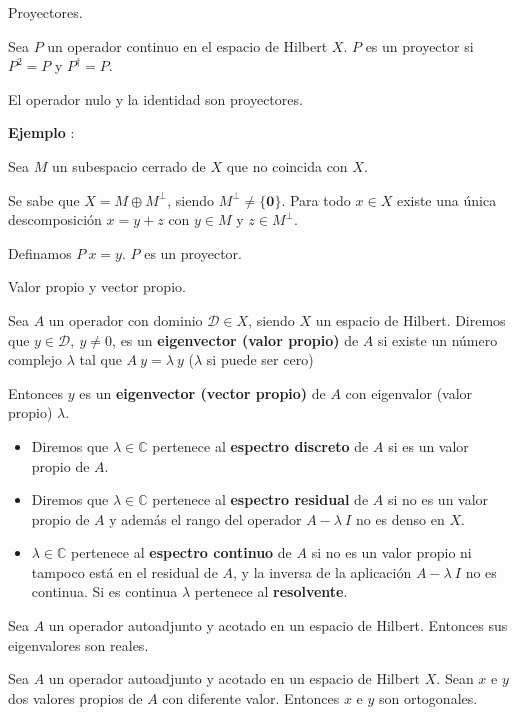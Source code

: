 \begin{defi} Proyectores.

Sea $P$ un operador continuo en el espacio de Hilbert $X$. $P$ es un proyector si $P^{2} = P$ y $P^{\dagger} =  P$.

El operador nulo y la identidad son proyectores.
\end{defi}
\textbf{Ejemplo} :

Sea $M$ un subespacio cerrado de $X$ que no coincida con $X$. 

Se sabe que $X =  M \oplus M^{\perp}$, siendo $M^{\perp} \neq \{ \bm{0} \}$. Para todo $x \in X$ existe una única descomposición $x = y + z$ con $y \in M$ y $z \in M^{\perp}$.

Definamos $P \: x = y$. $P$ es un proyector.
\begin{defi} Valor propio y vector propio.

Sea $A$ un operador con dominio $\mathcal{D} \in X$, siendo $X$ un espacio de Hilbert. Diremos que $y \in \mathcal{D}, \: y \neq 0$, es un \textbf{eigenvector (valor propio)} de $A$ si existe un número complejo $\lambda$ tal que $A \: y = \lambda \: y$ ($\lambda$ si puede ser cero)

Entonces $y$ es un \textbf{eigenvector (vector propio)} de $A$ con
eigenvalor (valor propio) $\lambda$.
\end{defi}
\begin{itemize}[label=\checkmark]
\item Diremos que $\lambda \in \mathbb{C}$ pertenece al \textbf{espectro discreto} de $A$ si es un valor propio de $A$.
\item Diremos que $\lambda \in \mathbb{C}$ pertenece al \textbf{espectro residual} de $A$ si no es un valor propio de $A$ y además el rango del operador $A - \lambda \: I$ no es denso en $X$.
\item $\lambda \in \mathbb{C}$ pertenece al \textbf{espectro continuo} de $A$ si no es un valor propio ni tampoco está en el residual de $A$, y la inversa de la aplicación $A - \lambda \: I$ no es continua. Si es continua $\lambda$ pertenece al \textbf{resolvente}.
\end{itemize}
\begin{lema}
Sea $A$ un operador autoadjunto y acotado en un espacio de Hilbert. Entonces sus eigenvalores son reales.
\end{lema}
\begin{lema}
Sea $A$ un operador autoadjunto y acotado en un espacio de Hilbert $X$. Sean $x$ e $y$ dos valores propios de $A$ con diferente valor. Entonces $x$ e $y$ son ortogonales.
\end{lema}
